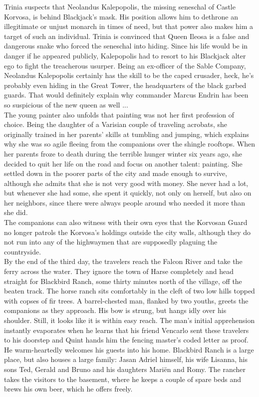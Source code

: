Trinia suspects that Neolandus Kalepopolis, the missing seneschal of Castle Korvosa, is behind Blackjack's mask. His position allows him to dethrone an illegitimate or unjust monarch in times of need, but that power also makes him a target of such an individual. Trinia is convinced that Queen Ileosa is a false and dangerous snake who forced the seneschal into hiding. Since his life would be in danger if he appeared publicly, Kalepopolis had to resort to his Blackjack alter ego to fight the treacherous usurper. Being an ex-officer of the Sable Company, Neolandus Kalepopolis certainly has the skill to be the caped crusader, heck, he's probably even hiding in the Great Tower, the headquarters of the black garbed guards. That would definitely explain why commander Marcus Endrin has been so suspicious of the new queen as well ...\\

The young painter also unfolds that painting was not her first profession of choice. Being the daughter of a Varisian couple of traveling acrobats, she originally trained in her parents' skills at tumbling and jumping, which explains why she was so agile fleeing from the companions over the shingle rooftops. When her parents froze to death during the terrible hunger winter six years ago, she decided to quit her life on the road and focus on another talent: painting. She settled down in the poorer parts of the city and made enough to survive, although she admits that she is not very good with money. She never had a lot, but whenever she had some, she spent it quickly, not only on herself, but also on her neighbors, since there were always people around who needed it more than she did.\\

The companions can also witness with their own eyes that the Korvosan Guard no longer patrols the Korvosa's holdings outside the city walls, although they do not run into any of the highwaymen that are supposedly plaguing the countryside.\\

By the end of the third day, the travelers reach the Falcon River and take the ferry across the water. They ignore the town of Harse completely and head straight for Blackbird Ranch, some thirty minutes north of the village, off the beaten track. The horse ranch sits comfortably in the cleft of two low hills topped with copses of fir trees. A barrel-chested man, flanked by two youths, greets the companions as they approach. His bow is strung, but hangs idly over his shoulder. Still, it looks like it is within easy reach. The man's initial apprehension instantly evaporates when he learns that his friend Vencarlo sent these travelers to his doorstep and Quint hands him the fencing master's coded letter as proof. He warm-heartedly welcomes his guests into his home. Blackbird Ranch is a large place, but also houses a large family: Jasan Adriel himself, his wife Lisanna, his sons Ted, Gerald and Bruno and his daughters Mari\"en and Romy. The rancher takes the visitors to the basement, where he keeps a couple of spare beds and brews his own beer, which he offers freely.\\

